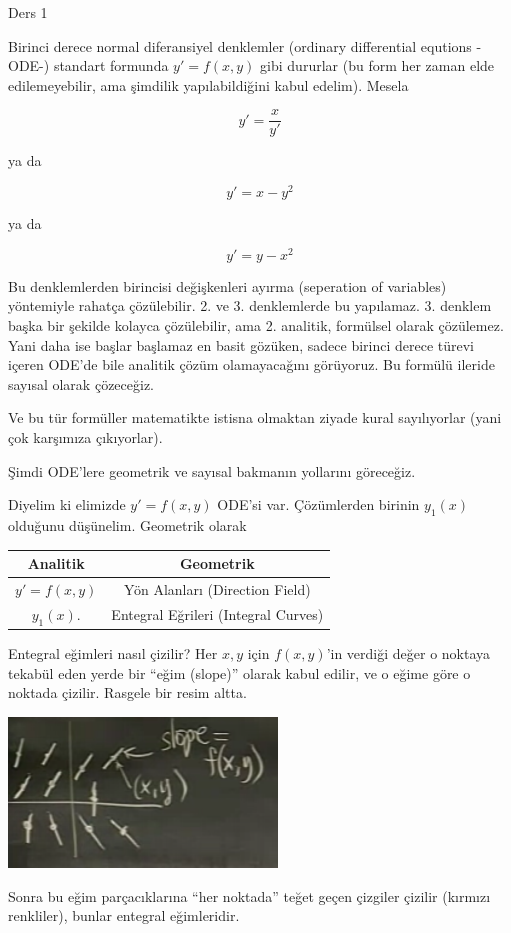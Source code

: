 \documentclass[12pt,fleqn]{article}\usepackage{../../common}
\begin{document}
Ders 1

Birinci derece normal diferansiyel denklemler (ordinary differential equtions
-ODE-) standart formunda $y'=f(x,y)$ gibi dururlar (bu form her zaman
elde edilemeyebilir, ama şimdilik yapılabildiğini kabul edelim).  Mesela

$$ y' = \frac{x}{y'} $$ 

ya da

$$y' = x-y^2$$

ya da

$$y' = y-x^2$$

Bu denklemlerden birincisi değişkenleri ayırma (seperation of variables)
yöntemiyle rahatça çözülebilir. 2. ve 3. denklemlerde bu
yapılamaz. 3. denklem başka bir şekilde kolayca çözülebilir, ama
2. analitik, formülsel olarak çözülemez. Yani daha ise başlar başlamaz en
basit gözüken, sadece birinci derece türevi içeren ODE'de bile analitik
çözüm olamayacağını görüyoruz. Bu formülü ileride sayısal olarak çözeceğiz.

Ve bu tür formüller matematikte istisna olmaktan ziyade kural sayılıyorlar (yani
çok karşımıza çıkıyorlar). 

Şimdi ODE'lere geometrik ve sayısal bakmanın yollarını göreceğiz.

Diyelim ki elimizde $y' = f(x,y)$ ODE'si var. Çözümlerden birinin
$y_1(x)$ olduğunu düşünelim. Geometrik olarak 

\begin{tabular}{cc}
Analitik & Geometrik \\ \hline
$y' = f(x,y)$ & Yön Alanları (Direction Field) \\
$y_1(x)$. & Entegral Eğrileri (Integral Curves)
\end{tabular}

Entegral eğimleri nasıl çizilir? Her $x,y$ için $f(x,y)$'in verdiği değer o
noktaya tekabül eden yerde bir ``eğim (slope)'' olarak kabul edilir, ve o eğime
göre o noktada çizilir. Rasgele bir resim altta.

\includegraphics[height=4cm]{./1_1.png}

Sonra bu eğim parçacıklarına ``her noktada'' teğet geçen çizgiler çizilir
(kırmızı renkliler), bunlar entegral eğimleridir.
\end{document}
